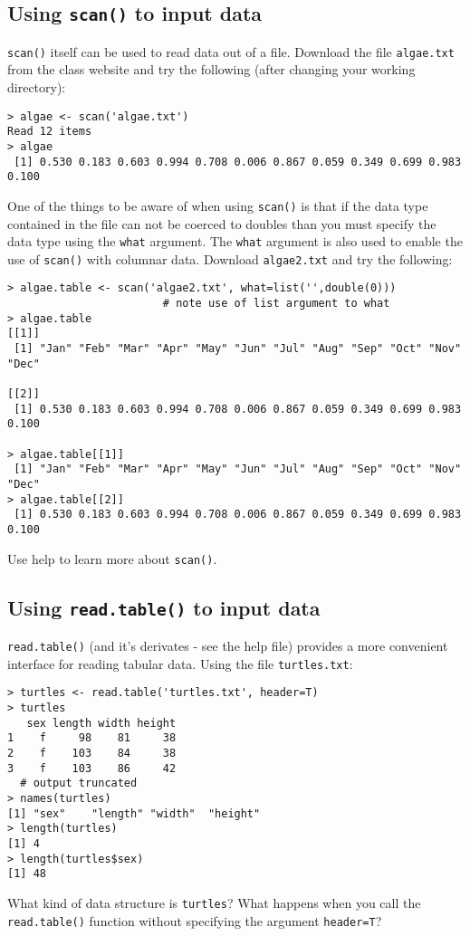 \subsection{Using \lstinline!scan()! to input data}

\lstinline!scan()! itself can be used to read data out of a file.
Download the file \lstinline!algae.txt! from the class website and try
the following (after changing your working directory):

\begin{lstlisting}
> algae <- scan('algae.txt')
Read 12 items
> algae
 [1] 0.530 0.183 0.603 0.994 0.708 0.006 0.867 0.059 0.349 0.699 0.983 0.100
\end{lstlisting}
One of the things to be aware of when using \lstinline!scan()! is that
if the data type contained in the file can not be coerced to doubles
than you must specify the data type using the \lstinline!what! argument.
The \lstinline!what! argument is also used to enable the use of
\lstinline!scan()! with columnar data. Download \lstinline!algae2.txt!
and try the following:

\begin{lstlisting}
> algae.table <- scan('algae2.txt', what=list('',double(0))) 
                        # note use of list argument to what
> algae.table
[[1]]
 [1] "Jan" "Feb" "Mar" "Apr" "May" "Jun" "Jul" "Aug" "Sep" "Oct" "Nov" "Dec"

[[2]]
 [1] 0.530 0.183 0.603 0.994 0.708 0.006 0.867 0.059 0.349 0.699 0.983 0.100

> algae.table[[1]]
 [1] "Jan" "Feb" "Mar" "Apr" "May" "Jun" "Jul" "Aug" "Sep" "Oct" "Nov" "Dec"
> algae.table[[2]]
 [1] 0.530 0.183 0.603 0.994 0.708 0.006 0.867 0.059 0.349 0.699 0.983 0.100
\end{lstlisting}
Use help to learn more about \lstinline!scan()!.

\subsection{Using \lstinline!read.table()! to input data}

\lstinline!read.table()! (and it's derivates - see the help file)
provides a more convenient interface for reading tabular data. Using the
file \lstinline!turtles.txt!:

\begin{lstlisting}
> turtles <- read.table('turtles.txt', header=T)
> turtles
   sex length width height
1    f     98    81     38
2    f    103    84     38
3    f    103    86     42
  # output truncated
> names(turtles)
[1] "sex"    "length" "width"  "height"
> length(turtles)
[1] 4
> length(turtles$sex)
[1] 48  
\end{lstlisting}
What kind of data structure is \lstinline!turtles!? What happens when
you call the \lstinline!read.table()! function without specifying the
argument \lstinline!header=T!?

